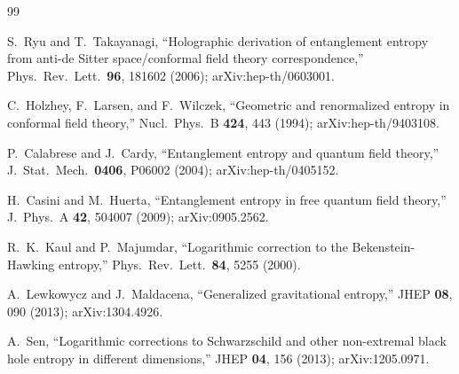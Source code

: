 \documentclass[twocolumn]{revtex4-2}
\begin{document}
\begin{thebibliography}{99}

S.~Ryu and T.~Takayanagi,
``Holographic derivation of entanglement entropy from anti-de Sitter
space/conformal field theory correspondence,''
Phys.\ Rev.\ Lett.\ \textbf{96}, 181602 (2006);
arXiv:hep-th/0603001.

C.~Holzhey, F.~Larsen, and F.~Wilczek,
``Geometric and renormalized entropy in conformal field theory,''
Nucl.\ Phys.\ B \textbf{424}, 443 (1994); arXiv:hep-th/9403108.

P.~Calabrese and J.~Cardy,
``Entanglement entropy and quantum field theory,''
J.\ Stat.\ Mech.\ \textbf{0406}, P06002 (2004); arXiv:hep-th/0405152.

H.~Casini and M.~Huerta,
``Entanglement entropy in free quantum field theory,''
J.\ Phys.\ A \textbf{42}, 504007 (2009); arXiv:0905.2562.

R.~K.~Kaul and P.~Majumdar,
``Logarithmic correction to the Bekenstein-Hawking entropy,''
Phys.\ Rev.\ Lett.\ \textbf{84}, 5255 (2000).

A.~Lewkowycz and J.~Maldacena,
``Generalized gravitational entropy,''
JHEP \textbf{08}, 090 (2013); arXiv:1304.4926.

A.~Sen,
``Logarithmic corrections to Schwarzschild and other non-extremal black hole entropy in different dimensions,''
JHEP \textbf{04}, 156 (2013); arXiv:1205.0971.

\end{thebibliography}
\end{document}
